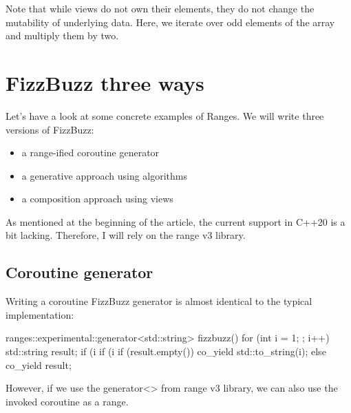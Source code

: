 Note that while views do not own their elements, they do not change the mutability of underlying data. Here, we iterate over odd elements of the array and multiply them by two.

\begin{box-note}
\end{box-note}

\section{FizzBuzz three ways}

Let’s have a look at some concrete examples of Ranges. We will write three versions of FizzBuzz:

\begin{itemize}
    \item a range-ified coroutine generator
    \item a generative approach using algorithms
    \item a composition approach using views
\end{itemize}

As mentioned at the beginning of the article, the current support in C++20 is a bit lacking. Therefore, I will rely on the range v3 library.

\subsection{Coroutine generator}

Writing a coroutine FizzBuzz generator is almost identical to the typical implementation:

\begin{box-note}
\begin{cppcode}
ranges::experimental::generator<std::string> fizzbuzz() {
    for (int i = 1; ; i++) {
        std::string result;
        if (i %
        if (i %
        if (result.empty()) co_yield std::to_string(i);
        else co_yield result;
    }
}
\end{cppcode}
\end{box-note}

However, if we use the generator<> from range v3 library, we can also use the invoked coroutine as a range.


